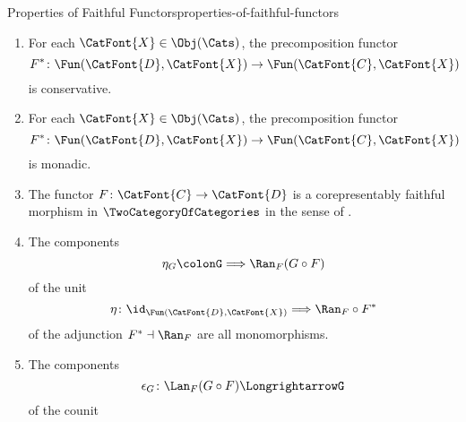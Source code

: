 \begin{proposition}{Properties of Faithful Functors}{properties-of-faithful-functors}
\begin{enumerate}
\begin{enumerate}
                    is faithful.
                \item\label{properties-of-faithful-functors-interaction-with-precomposition-3-b}For each $\CatFont{X}\in\Obj(\Cats)$, the precomposition functor
                    \[
                        F^{*}
                        \colon
                        \Fun(\CatFont{D},\CatFont{X})
                        \to
                        \Fun(\CatFont{C},\CatFont{X})
                    \]%
                    is conservative.
                \item\label{properties-of-faithful-functors-interaction-with-precomposition-3-c}For each $\CatFont{X}\in\Obj(\Cats)$, the precomposition functor
                    \[
                        F^{*}
                        \colon
                        \Fun(\CatFont{D},\CatFont{X})
                        \to
                        \Fun(\CatFont{C},\CatFont{X})
                    \]%
                    is monadic.
                \item\label{properties-of-faithful-functors-interaction-with-precomposition-3-d}The functor $F\colon\CatFont{C}\to\CatFont{D}$ is a corepresentably faithful morphism in $\TwoCategoryOfCategories$ in the sense of .
                \item\label{properties-of-faithful-functors-interaction-with-precomposition-3-e}The components
                    \[
                        \eta_{G}%
                        \colon%
                        G%
                        \Longrightarrow%
                        \Ran_{F}(G\circ F)%
                    \]%
                    of the unit
                    \[
                        \eta%
                        \colon%
                        \id_{\Fun(\CatFont{D},\CatFont{X})}%
                        \Longrightarrow%
                        \Ran_{F}\circ F^{*}%
                    \]%
                    of the adjunction $F^{*}\dashv\Ran_{F}$ are all monomorphisms.
                \item\label{properties-of-faithful-functors-interaction-with-precomposition-3-f}The components
                    \[
                        \epsilon_{G}%
                        \colon%
                        \Lan_{F}(G\circ F)%
                        \Longrightarrow%
                        G%
                    \]%
                    of the counit
                    \[
\]
\end{enumerate}
\end{enumerate}
\end{proposition}
